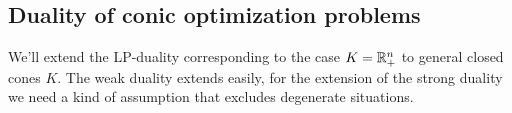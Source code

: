 

\subsection{Duality of conic optimization problems}
\label{subsec:konische:Dualitaet}

We'll extend the LP-duality corresponding to the case $K=\mathbb{R}_+^n$ to general closed  cones $K$. The weak duality extends easily, for the extension of the strong duality we need a kind of assumption that excludes degenerate situations. 

